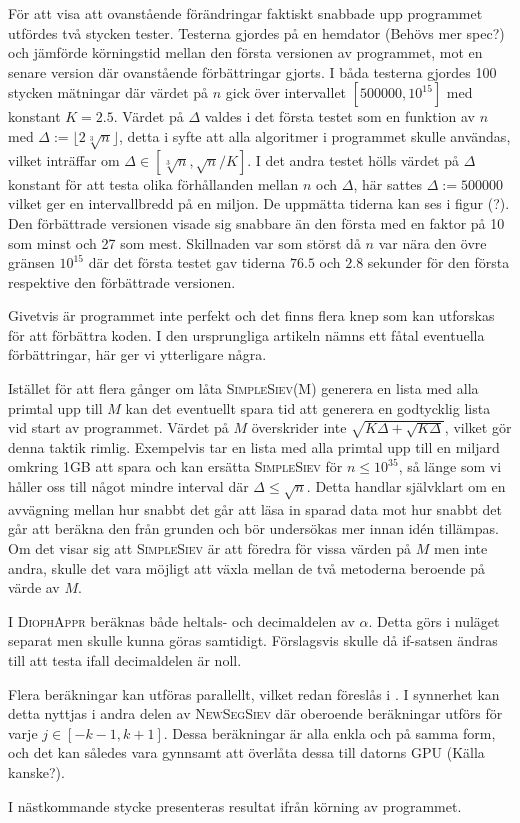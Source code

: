För att visa att ovanstående förändringar faktiskt snabbade upp programmet utfördes två stycken tester.
Testerna gjordes på en hemdator (Behövs mer spec?) och jämförde körningstid mellan den första versionen av programmet, mot en senare version där ovanstående förbättringar gjorts.
I båda testerna gjordes 100 stycken mätningar där värdet på $n$ gick över intervallet $[500000, 10^{15}]$ med konstant $K=2.5$.
Värdet på $\Delta$ valdes i det första testet som en funktion av $n$ med $\Delta := \lfloor2\sqrt[3]{n}\rfloor$,
detta i syfte att alla algoritmer i programmet skulle användas, vilket inträffar om $\Delta\in[\sqrt[3]{n},\sqrt{n}/K]$.
I det andra testet hölls värdet på $\Delta$ konstant för att testa olika förhållanden mellan $n$ och $\Delta$, här sattes $\Delta := 500000$ vilket ger en intervallbredd på en miljon. De uppmätta tiderna kan ses i figur (?). Den förbättrade versionen visade sig snabbare än den första med en faktor på 10 som minst och 27 som mest. Skillnaden var som störst då $n$ var nära den övre gränsen $10^{15}$ där det första testet gav tiderna $76.5$ och $2.8$ sekunder för den första respektive den förbättrade versionen.


Givetvis är programmet inte perfekt och det finns flera knep som kan utforskas för att förbättra koden.
I den ursprungliga artikeln \cite{HaraldSieve} nämns ett fåtal eventuella förbättringar, här ger vi ytterligare några.
\begin{myitemize}
    \item
    Istället för att flera gånger om låta \textsc{SimpleSiev(M)} generera en lista med alla primtal upp till $M$ kan det eventuellt spara tid att generera en godtycklig lista vid start av programmet.
    Värdet på $M$ överskrider inte $\sqrt{K\Delta+\sqrt{K\Delta}}$, vilket gör denna taktik rimlig.
    Exempelvis tar en lista med alla primtal upp till en miljard omkring 1GB att spara och kan ersätta \textsc{SimpleSiev} för $n\leq 10^{35}$, så länge som vi håller oss till något mindre interval där $\Delta\leq\sqrt{n}$.
    Detta handlar självklart om en avvägning mellan hur snabbt det går att läsa in sparad data mot hur snabbt det går att beräkna den från grunden och bör undersökas mer innan idén tillämpas. 
    Om det visar sig att \textsc{SimpleSiev} är att föredra för vissa värden på $M$ men inte andra, 
    skulle det vara möjligt att växla mellan de två metoderna beroende på värde av $M$.
    \item
    I \textsc{DiophAppr} beräknas både heltals- och decimaldelen av $\alpha$. Detta görs i nuläget separat men skulle kunna göras samtidigt.
    Förslagsvis skulle då if-satsen ändras till att testa ifall decimaldelen är noll.
    \item
    Flera beräkningar kan utföras parallellt, vilket redan föreslås i \cite{HaraldSieve}. 
    I synnerhet kan detta nyttjas i andra delen av \textsc{NewSegSiev} där oberoende beräkningar utförs för varje $j\in[-k-1,k+1]$.
    Dessa beräkningar är alla enkla och på samma form, och det kan således vara gynnsamt att överlåta dessa till datorns GPU (Källa kanske?).
\end{myitemize}

I nästkommande stycke presenteras resultat ifrån körning av programmet.
